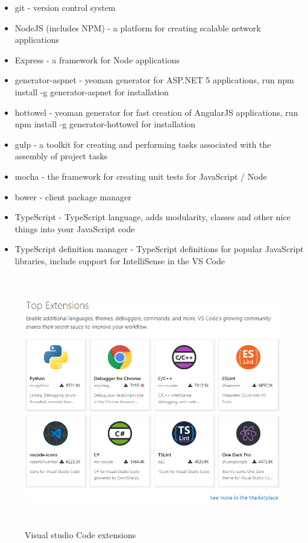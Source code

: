 \begin{itemize}
\item git - version control system

\item NodeJS (includes NPM) - a platform for creating scalable network applications

\item Express - a framework for Node applications

\item generator-aspnet - yeoman generator for ASP.NET 5 applications, run npm install -g generator-aspnet for installation

\item hottowel - yeoman generator for fast creation of AngularJS applications, run npm install -g generator-hottowel for installation

\item gulp - a toolkit for creating and performing tasks associated with the assembly of project tasks

\item mocha - the framework for creating unit tests for JavaScript / Node

\item bower - client package manager

\item TypeScript - TypeScript language, adds modularity, classes and other nice things into your JavaScript code

\item TypeScript definition manager - TypeScript definitions for popular JavaScript libraries, include support for IntelliSense in the VS Code \cite{VSC}
\end{itemize}

\begin{figure}[h]
\centering
\includegraphics[width=14cm, height=11cm]{img/VSExtentions.png}
\caption{Visual studio Code extensions}
\end{figure}

